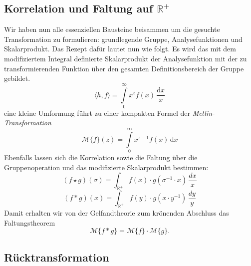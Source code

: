 \subsection{Korrelation und Faltung auf $\mathbb{R^+}$
\label{mellin:subsection:faltung}}
Wir haben nun alle essenziellen Bausteine beisammen um die gesuchte Transformation zu formulieren: grundlegende Gruppe, 
Analysefunktionen und Skalarprodukt.
Das Rezept dafür lautet nun wie folgt. Es wird das mit dem modifiziertem Integral definierte Skalarprodukt der Analysefunktion 
mit der zu transformierenden Funktion über den gesamten Definitionsbereich der Gruppe gebildet.
\begin{equation}
    \langle h,f \rangle = \int\limits_{0}^{\infty} x^{z} f(x) \,\frac{\mathrm{d}x}{x}
\end{equation}
eine kleine Umformung führt zu einer kompakten Formel der \emph{Mellin-Transformation}
\begin{equation}
    \mathcal{M}\{f \}(z) = \int\limits_{0}^{\infty} x^{z-1} f(x) \,\mathrm{d}x
    \label{mellin:mellin}
\end{equation}
Ebenfalls lassen sich die Korrelation sowie die Faltung über die Gruppenoperation und das modifizierte Skalarprodukt bestimmen:
\begin{equation}
    (f \star g)(\sigma ) = \int_\mathbb{R^+} f(x) \cdot g(\sigma ^{-1} \cdot x)\,\frac{dx}{x}
    \label{mellin:kreuzkorrelation*}
\end{equation}
\begin{equation}
    (f \ast g)(x) = \int_\mathbb{R^+} f(y) \cdot g(x \cdot y^{-1})\,\frac{dy}{y} 
\end{equation}
Damit erhalten wir von der Gelfandtheorie zum krönenden Abschluss das Faltungstheorem
\begin{equation}
    \mathcal{M}\{f \ast g\} = \mathcal{M}\{f\} \cdot \mathcal{M}\{g\}.
\end{equation}

\subsection{Rücktransformation
\label{mellin:subsection:ruecktransformation}}


